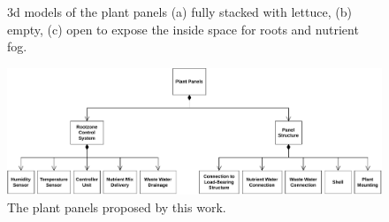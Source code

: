 \begin{figure}[htbp]%
    \centering
    \quad
    \quad
    \caption{3d models of the plant panels (a) fully stacked with lettuce, (b) empty, (c) open to expose the inside space for roots and nutrient fog.}%
    \label{fig:3d-panel}%
\end{figure}

\begin{figure}[htbp]
  \centering
  \includegraphics[width=\textwidth]{img/architecture/panels.pdf}
  \caption{The plant panels proposed by this work.}
  \label{fig:panels}
\end{figure}

